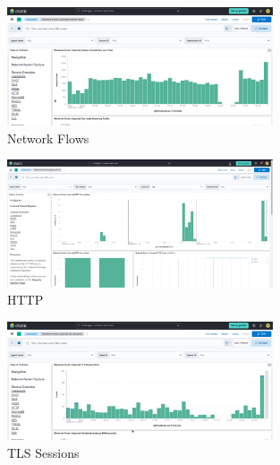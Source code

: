 \documentclass{report}
\begin{document}
\begin{figure}
	\centering
	\includegraphics[width=0.7\textwidth]{Images/dashboard-flows.png}
	\caption{Network Flows}
	\label{fig:Network Flows}
\end{figure}
\begin{figure}
	\centering
	\includegraphics[width=0.7\textwidth]{Images/dashboard-http.png}
	\caption{HTTP}
	\label{fig:HTTP}
\end{figure}
\begin{figure}
	\centering
	\includegraphics[width=0.7\textwidth]{Images/dashboard-tls.png}
	\caption{TLS Sessions}
	\label{fig:TLS Sessions}
\end{figure}
\end{document}
